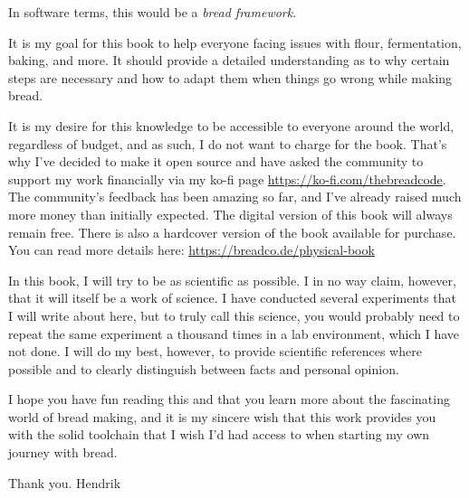 In software terms, this would be a {\it bread framework}.

It is my goal for this book to help everyone facing issues with flour, fermentation, baking,
and more. It should provide a detailed understanding as to why certain steps are necessary
and how to adapt them when things go wrong while making bread.

It is my desire for this knowledge to be accessible to everyone around the world, regardless
of budget, and as such, I do not want to charge for the book. That's why I've decided to make
it open source and have asked the community to support my work financially via my ko-fi page
\url{https://ko-fi.com/thebreadcode}. The community's feedback has been amazing so far, and
I've already raised much more money than initially expected. The digital version of this book
will always remain free. There is also a hardcover version of the book available for purchase.
You can read more details here: \url{https://breadco.de/physical-book}

In this book, I will try to be as scientific as possible. I in no way claim, however, that
it will itself be a work of science. I have conducted several experiments that I will write
about here, but to truly call this science, you would probably need to repeat the same experiment
a thousand times in a lab environment, which I have not done. I will do my best, however, to provide
scientific references where possible and to clearly distinguish between facts and personal opinion.

I hope you have fun reading this and that you learn more about the fascinating world of bread
making, and it is my sincere wish that this work provides you with the solid toolchain that I wish
I'd had access to when starting my own journey with bread.

Thank you.
Hendrik

